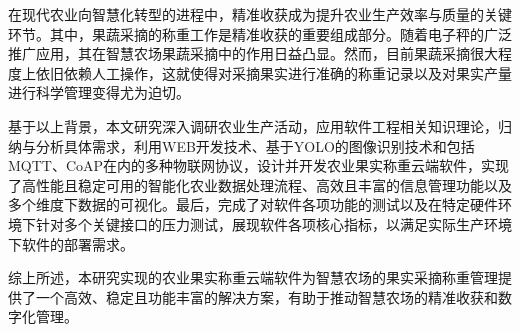 在现代农业向智慧化转型的进程中，精准收获成为提升农业生产效率与质量的关键环节。其中，果蔬采摘的称重工作是精准收获的重要组成部分。随着电子秤的广泛推广应用，其在智慧农场果蔬采摘中的作用日益凸显。然而，目前果蔬采摘很大程度上依旧依赖人工操作，这就使得对采摘果实进行准确的称重记录以及对果实产量进行科学管理变得尤为迫切。

基于以上背景，本文研究深入调研农业生产活动，应用软件工程相关知识理论，归纳与分析具体需求，利用WEB开发技术、基于YOLO的图像识别技术和包括MQTT、CoAP在内的多种物联网协议，设计并开发农业果实称重云端软件，实现了高性能且稳定可用的智能化农业数据处理流程、高效且丰富的信息管理功能以及多个维度下数据的可视化。最后，完成了对软件各项功能的测试以及在特定硬件环境下针对多个关键接口的压力测试，展现软件各项核心指标，以满足实际生产环境下软件的部署需求。

综上所述，本研究实现的农业果实称重云端软件为智慧农场的果实采摘称重管理提供了一个高效、稳定且功能丰富的解决方案，有助于推动智慧农场的精准收获和数字化管理。 